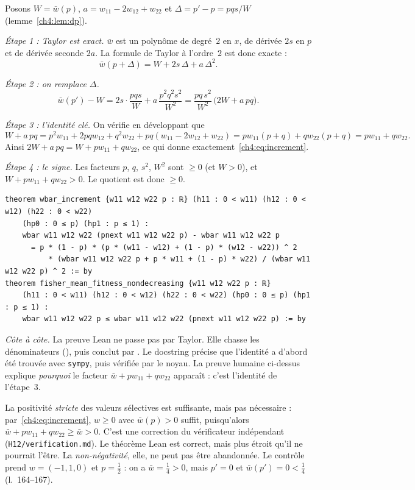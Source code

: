 \begin{humanproof}
Posons $W=\bar w(p)$, $a=w_{11}-2w_{12}+w_{22}$ et $\Delta=p'-p=pqs/W$ (lemme~\ref{ch4:lem:dp}).

\emph{Étape 1 : Taylor est exact.} $\bar w$ est un polynôme de degré~$2$ en $x$, de dérivée $2s$ en $p$ et de
dérivée seconde $2a$. La formule de Taylor à l'ordre~$2$ est donc exacte :
\[
\bar w(p+\Delta)=W+2s\,\Delta+a\,\Delta^2 .
\]

\emph{Étape 2 : on remplace $\Delta$.}
\[
\bar w(p')-W=2s\cdot\frac{pqs}{W}+a\,\frac{p^2q^2s^2}{W^2}=\frac{pq\,s^2}{W^2}\,\bigl(2W+a\,pq\bigr).
\]

\emph{Étape 3 : l'identité clé.} On vérifie en développant que
\[
W+a\,pq=p^2w_{11}+2pqw_{12}+q^2w_{22}+pq(w_{11}-2w_{12}+w_{22})=pw_{11}(p+q)+qw_{22}(p+q)=pw_{11}+qw_{22}.
\]
Ainsi $2W+a\,pq=W+pw_{11}+qw_{22}$, ce qui donne exactement~\eqref{ch4:eq:increment}.

\emph{Étape 4 : le signe.} Les facteurs $p$, $q$, $s^2$, $W^2$ sont $\ge0$ (et $W>0$), et
$W+pw_{11}+qw_{22}>0$. Le quotient est donc $\ge0$.
\end{humanproof}

\begin{leanbox}
\begin{lstlisting}[language=Lean]
theorem wbar_increment {w11 w12 w22 p : ℝ} (h11 : 0 < w11) (h12 : 0 < w12) (h22 : 0 < w22)
    (hp0 : 0 ≤ p) (hp1 : p ≤ 1) :
    wbar w11 w12 w22 (pnext w11 w12 w22 p) - wbar w11 w12 w22 p
      = p * (1 - p) * (p * (w11 - w12) + (1 - p) * (w12 - w22)) ^ 2
          * (wbar w11 w12 w22 p + p * w11 + (1 - p) * w22) / (wbar w11 w12 w22 p) ^ 2 := by
theorem fisher_mean_fitness_nondecreasing {w11 w12 w22 p : ℝ}
    (h11 : 0 < w11) (h12 : 0 < w12) (h22 : 0 < w22) (hp0 : 0 ≤ p) (hp1 : p ≤ 1) :
    wbar w11 w12 w22 p ≤ wbar w11 w12 w22 (pnext w11 w12 w22 p) := by
\end{lstlisting}
\emph{Côte à côte.} La preuve Lean ne passe pas par Taylor. Elle chasse les dénominateurs (),
puis conclut par . Le docstring précise que l'identité a d'abord été trouvée avec \texttt{sympy}, puis
vérifiée par le noyau. La preuve humaine ci-dessus explique \emph{pourquoi} le facteur
$\bar w+pw_{11}+qw_{22}$ apparaît : c'est l'identité de l'étape~3.
\end{leanbox}

\begin{remark}\label{ch4:rem:positivite}
La positivité \emph{stricte} des valeurs sélectives est suffisante, mais pas nécessaire : par~\eqref{ch4:eq:increment},
$w\ge0$ avec $\bar w(p)>0$ suffit, puisqu'alors $\bar w+pw_{11}+qw_{22}\ge\bar w>0$. C'est une correction du
vérificateur indépendant (\texttt{H12/verification.md}). Le théorème Lean est correct, mais plus étroit qu'il ne
pourrait l'être. La \emph{non-négativité}, elle, ne peut pas être abandonnée. Le contrôle
 prend $w=(-1,1,0)$ et $p=\frac12$ : on a $\bar w=\frac14>0$, mais $p'=0$ et
$\bar w(p')=0<\frac14$ \tierA{} (l.~164--167).
\end{remark}

